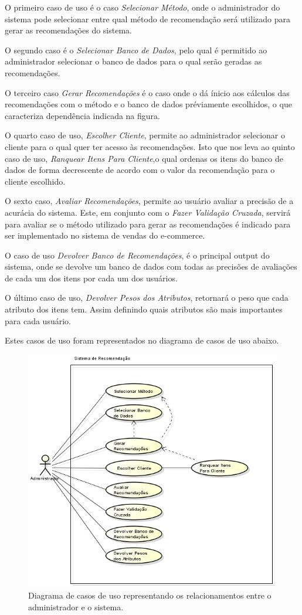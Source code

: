 O primeiro caso de uso é o caso \textit{Selecionar Método}, onde o administrador do sistema pode selecionar entre qual método de recomendação será utilizado para gerar as recomendações do sistema.

O segundo caso é o \textit{Selecionar Banco de Dados}, pelo qual é permitido ao administrador selecionar o banco de dados para o qual serão geradas as recomendações.

O terceiro caso \textit{Gerar Recomendações} é o caso onde o dá ínicio aos cálculos das recomendações com o método e o banco de dados préviamente escolhidos, o que caracteriza dependência indicada na figura.

O quarto caso de uso, \textit{Escolher Cliente}, permite ao administrador selecionar o cliente para o qual quer ter acesso às recomendações. Isto que nos leva ao quinto caso de uso, \textit{Ranquear Itens Para Cliente},o qual ordenas os itens do banco de dados de forma decrescente de acordo com o valor da recomendação para o cliente escolhido.

 O sexto caso, \textit{Avaliar Recomendações}, permite ao usuário avaliar a precisão de a acurácia do sistema. Este, em conjunto com o \textit{Fazer Validação Cruzada}, servirá para avaliar se o método utilizado para gerar as recomendações é indicado para ser implementado no sistema de vendas do e-commerce.

 O caso de uso \textit{Devolver Banco de Recomendações}, é o principal output do sistema, onde se devolve um banco de dados com todas as precisões de avaliações de cada um dos itens por cada um dos usuários.

 O último caso de uso, \textit{Devolver Pesos dos Atributos}, retornará o peso que cada atributo dos itens tem. Assim definindo quais atributos são mais importantes para cada usuário.

 Estes casos de uso foram representados no diagrama de casos de uso abaixo.

 \begin{figure}[htp]
    \begin{center}
    \includegraphics[width=1\textwidth]{img/CasosDeUso}
    \end{center}
    \label{fig:Diagrama de Casos de Uso}
    \caption{Diagrama de casos de uso representando os relacionamentos entre o administrador e o sistema.}
\end{figure}